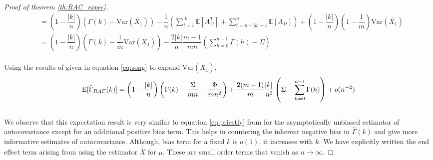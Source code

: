 \documentclass[12pt]{article}
\newcommand{\Var}{\text{Var}}
\begin{document}
\begin{proof}[Proof of theorem \ref{th:RAC_expec}]
\begin{align*}
    &= \left(1- \dfrac{|k|}{n}\right)\left(\Gamma(k) - \Var(\overline{X_1})\right) - \dfrac{1}{n} \left(\sum\limits_{t=1}^{|k|}\mathbb{E}[A_{1t}^T] + \sum\limits_{t=n-|k|+1}^{n}\mathbb{E}[A_{1t}]\right) + \left(1- \dfrac{|k|}{n}\right)\left(1-\dfrac{1}{m}\right)\Var(\overline{X_1})\\
    &= \left(1- \dfrac{|k|}{n}\right)\left(\Gamma(k) - \dfrac{1}{m}\Var(\overline{X_1})\right) - \dfrac{2|k|}{n}\dfrac{m-1}{mn}\left(\sum_{h=0}^{n-1}\Gamma(h) - \Sigma\right)
\end{align*}
\\
Using the results of \cite{song1995optimal} given in equation \ref{eq:song} to expand $\Var(\overline{X}_1)$,
\[
\mathbb{E}[\hat{\Gamma}_{RAC}(k)] = \left(1- \dfrac{|k|}{n}\right)\left(\Gamma(k) - \dfrac{\Sigma}{mn} - \dfrac{\Phi}{mn^2}\right)  + \dfrac{2(m-1)}{m}\dfrac{\abs{k}}{n^2} \left(\Sigma - \sum_{h=0}^{n-1}\Gamma(h)\right) + o(n^{-2})
\]
\\
We observe that this expectation result is very similar to equation \ref{eq:priestly} from \cite{priestley1981spectral} for the asymptotically unbiased estimator of autocovariance except for an additional positive bias term. This helps in countering the inherent negative bias in $\hat{\Gamma}(k)$ and give more informative estimates of autocovariance.  Although, bias term for a fixed $k$ is $o(1)$, it increases with $k$. We have explicitly written the end effect term arising from using the estimator $\overline{\overline{X}}$ for $\mu$. These are small order terms that vanish as $n \to \infty$.
\end{proof}
\end{document}
